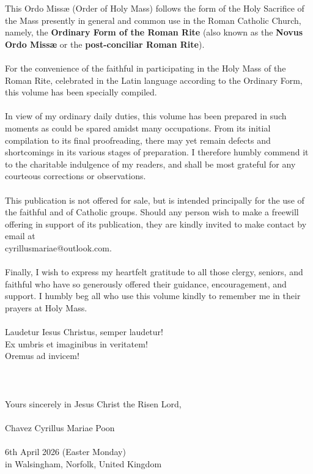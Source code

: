 \documentclass[12pt, a4paper]{article}
\begin{document}
	\noindent This Ordo Missæ (Order of Holy Mass) follows the form of the Holy Sacrifice of the Mass presently in general and common use in the Roman Catholic Church, namely, the \textbf{Ordinary Form of the Roman Rite} (also known as the \textbf{Novus Ordo Missæ} or the \textbf{post-conciliar Roman Rite}).
	\\\\
	For the convenience of the faithful in participating in the Holy Mass of the Roman Rite, celebrated in the Latin language according to the Ordinary Form, this volume has been specially compiled.
	\\\\
	In view of my ordinary daily duties, this volume has been prepared in such moments as could be spared amidst many occupations. From its initial compilation to its final proofreading, there may yet remain defects and shortcomings in its various stages of preparation. I therefore humbly commend it to the charitable indulgence of my readers, and shall be most grateful for any courteous corrections or observations.
	\\\\
	This publication is not offered for sale, but is intended principally for the use of the faithful and of Catholic groups. Should any person wish to make a freewill offering in support of its publication, they are kindly invited to make contact by email at 
	\\
	cyrillusmariae@outlook.com.
	\\\\
	Finally, I wish to express my heartfelt gratitude to all those clergy, seniors, and faithful who have so generously offered their guidance, encouragement, and support. I humbly beg all who use this volume kindly to remember me in their prayers at Holy Mass.
	\\\\
	Laudetur Iesus Christus, semper laudetur!
	\\
	Ex umbris et imaginibus in veritatem!
	\\
	Oremus ad invicem!
	\\\\
	\\\\
	\mbox{}\hfill Yours sincerely in Jesus Christ the Risen Lord,
	\\\\
	\mbox{}\hfill Chavez Cyrillus Mariae Poon
	\\\\
	\mbox{}\hfill 6th April 2026 (Easter Monday)
	\\
	\mbox{}\hfill in Walsingham, Norfolk, United Kingdom
	
\end{document}
